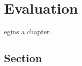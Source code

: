 \let\textcircled=\pgftextcircled
\chapter{Evaluation}
\label{chap:evaluation}

egins a chapter. 

\section{Section}
\label{sec:eval}
